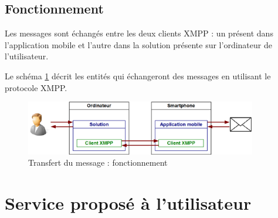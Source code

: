 
\subsection{Fonctionnement}

Les messages sont échangés entre les deux clients XMPP : un présent dans l'application mobile et l'autre dans la solution présente sur l'ordinateur de l'utilisateur.

Le schéma \ref{schemaFonctionnement_protocoleTransfert} décrit les entités qui échangeront des messages en utilisant le protocole XMPP.
\begin{figure}[!h]
	\center
	\includegraphics[width=0.9\textwidth]{img/schemaFonctionnement_protocoleTransfert.png}
	\caption{Transfert du message : fonctionnement}
	\label{schemaFonctionnement_protocoleTransfert}
\end{figure}






\section{Service proposé à l'utilisateur}
\label{Service proposé à l'utilisateur}


